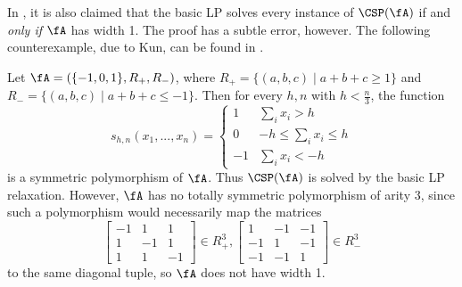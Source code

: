 \begin{rem} In \cite{lp-width-1}, it is also claimed that the basic LP solves every instance of $\CSP(\fA)$ if and \emph{only if} $\fA$ has width 1. The proof has a subtle error, however. The following counterexample, due to Kun, can be found in \cite{dalmau-approximation}.
\end{rem}

\begin{ex} Let $\fA = (\{-1,0,1\}, R_+, R_-)$, where $R_+ = \{(a,b,c) \mid a+b+c \ge 1\}$ and $R_- = \{(a,b,c) \mid a+b+c \le -1\}$. Then for every $h,n$ with $h < \frac{n}{3}$, the function
\[
s_{h,n}(x_1, ..., x_n) = \begin{cases}1 & \sum_i x_i > h\\ 0 & -h \le \sum_i x_i \le h\\ -1 & \sum_i x_i < -h\end{cases}
\]
is a symmetric polymorphism of $\fA$. Thus $\CSP(\fA)$ is solved by the basic LP relaxation. However, $\fA$ has no totally symmetric polymorphism of arity $3$, since such a polymorphism would necessarily map the matrices
\[
\begin{bmatrix} -1 & 1 & 1\\ 1 & -1 & 1\\ 1 & 1 & -1\end{bmatrix} \in R_+^3, \begin{bmatrix} 1 & -1 & -1\\ -1 & 1 & -1\\ -1 & -1 & 1\end{bmatrix} \in R_-^3
\]
to the same diagonal tuple, so $\fA$ does not have width 1.
\end{ex}

